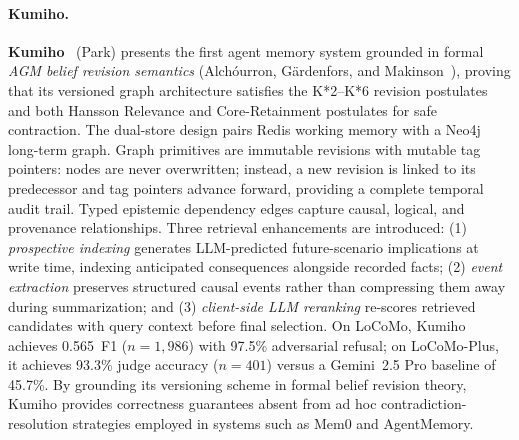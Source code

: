 \paragraph{Kumiho.}
\textbf{Kumiho}~\cite{kumiho2026} (Park) presents the first agent memory
system grounded in formal \emph{AGM belief revision semantics}
(Alch\'{o}urron, G\"{a}rdenfors, and Makinson~\cite{agm1985}), proving
that its versioned graph architecture satisfies the K*2--K*6 revision
postulates and both Hansson Relevance and Core-Retainment postulates for
safe contraction.  The dual-store design pairs Redis working memory with
a Neo4j long-term graph.  Graph primitives are immutable revisions with
mutable tag pointers: nodes are never overwritten; instead, a new
revision is linked to its predecessor and tag pointers advance forward,
providing a complete temporal audit trail.  Typed epistemic dependency
edges capture causal, logical, and provenance relationships.  Three
retrieval enhancements are introduced: (1) \emph{prospective indexing}
generates LLM-predicted future-scenario implications at write time,
indexing anticipated consequences alongside recorded facts; (2)
\emph{event extraction} preserves structured causal events rather than
compressing them away during summarization; and (3)
\emph{client-side LLM reranking} re-scores retrieved candidates with
query context before final selection.  On LoCoMo, Kumiho achieves
0.565~F1 ($n=1{,}986$) with 97.5\% adversarial refusal; on LoCoMo-Plus,
it achieves 93.3\% judge accuracy ($n=401$) versus a Gemini~2.5 Pro
baseline of 45.7\%.  By grounding its versioning scheme in formal belief
revision theory, Kumiho provides correctness guarantees absent from
ad hoc contradiction-resolution strategies employed in systems such as
Mem0 and AgentMemory.

